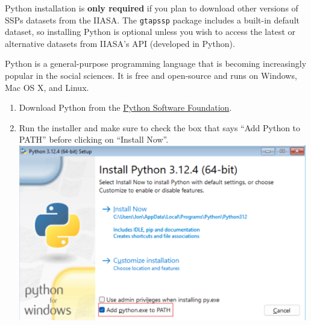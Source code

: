 \documentclass[
  letterpaper,
  DIV=11,
  numbers=noendperiod]{scrartcl}
\begin{document}
\begin{tcolorbox}[enhanced jigsaw, leftrule=.75mm, toprule=.15mm, breakable, titlerule=0mm, opacitybacktitle=0.6, colframe=quarto-callout-tip-color-frame, arc=.35mm, bottomtitle=1mm, toptitle=1mm, title=\textcolor{quarto-callout-tip-color}{\faLightbulb}\hspace{0.5em}{Python install details}, rightrule=.15mm, colback=white, bottomrule=.15mm, opacityback=0, left=2mm, colbacktitle=quarto-callout-tip-color!10!white, coltitle=black]

\begin{tcolorbox}[enhanced jigsaw, leftrule=.75mm, toprule=.15mm, breakable, titlerule=0mm, opacitybacktitle=0.6, colframe=quarto-callout-important-color-frame, arc=.35mm, bottomtitle=1mm, toptitle=1mm, title=\textcolor{quarto-callout-important-color}{\faExclamation}\hspace{0.5em}{Important}, rightrule=.15mm, colback=white, bottomrule=.15mm, opacityback=0, left=2mm, colbacktitle=quarto-callout-important-color!10!white, coltitle=black]

Python installation is \textbf{only required} if you plan to download
other versions of SSPs datasets from the IIASA. The \texttt{gtapssp}
package includes a built-in default dataset, so installing Python is
optional unless you wish to access the latest or alternative datasets
from IIASA's API (developed in Python).

\end{tcolorbox}

Python is a general-purpose programming language that is becoming
increasingly popular in the social sciences. It is free and open-source
and runs on Windows, Mac OS X, and Linux.

\begin{enumerate}
\def\labelenumi{\arabic{enumi}.}
\item
  Download Python from the
  \href{https://www.python.org/downloads/}{Python Software Foundation}.
\item
  Run the installer and make sure to check the box that says ``Add
  Python to PATH'' before clicking on ``Install Now''.\\
  \includegraphics[width=4.94792in,height=\textheight]{images/clipboard-1705657641.png}
\end{enumerate}

\end{tcolorbox}
\end{document}
